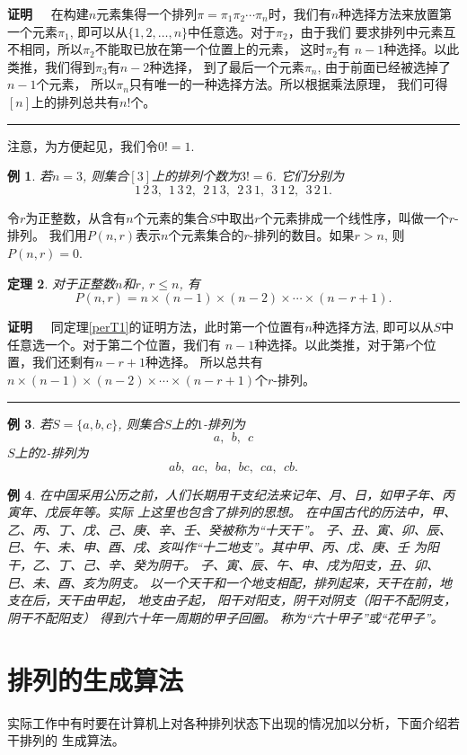 \documentclass[a4paper,11pt,twoside]{book}
\newtheorem{thm}{定理}[section]
\newtheorem{exa}[thm]{例}
\def\qed{\nopagebreak\hfill{\rule{4pt}{7pt}}\medbreak}
\def\pf{{\bf 证明~~ }}
\begin{document}
\pf 在构建$n$元素集得一个排列$\pi=\pi_1\pi_2 \cdots
\pi_n$时，我们有$n$种选择方法来放置第一个元素$\pi_1$,
即可以从$\{1,2,\ldots,n\}$中任意选。对于$\pi_2$，由于我们
要求排列中元素互不相同，所以$\pi_2$不能取已放在第一个位置上的元素，
这时$\pi_2$有 $n-1$种选择。以此类推，我们得到$\pi_3$有$n-2$种选择，
到了最后一个元素$\pi_n$, 由于前面已经被选掉了$n-1$个元素，
所以$\pi_n$只有唯一的一种选择方法。所以根据乘法原理，
我们可得$[n]$上的排列总共有$n!$个。 \qed


注意，为方便起见，我们令$0!=1$.

\begin{exa}
若$n=3$, 则集合$[3]$上的排列个数为$3!=6$. 它们分别为
\[ 1\,2\,3,~~ 1\,3\,2,~~2\,1\,3,~~2\,3\,1,~~ 3\,1\,2,~~ 3\,2\,1.\]
\end{exa}

令$r$为正整数，从含有$n$个元素的集合$S$中取出$r$个元素排成一个线性序，叫做一个$r$-排列。
我们用$P(n,r)$表示$n$个元素集合的$r$-排列的数目。如果$r>n$, 则$P(n,r)=0$.

\begin{thm}
对于正整数$n$和$r$, $r\leq n$, 有
\[ P(n,r)=n\times (n-1) \times (n-2)\times \cdots \times (n-r+1).\]
\end{thm}

\pf 同定理\ref{perT1}的证明方法，此时第一个位置有$n$种选择方法, 即可以从$S$中任意选一个。对于第二个位置，我们有
$n-1$种选择。以此类推，对于第$r$个位置，我们还剩有$n-r+1$种选择。
所以总共有$n\times (n-1) \times (n-2)\times \cdots \times (n-r+1)$个$r$-排列。 \qed

\begin{exa}
若$S=\{a,b,c\}$, 则集合$S$上的$1$-排列为
\[ a,~~b,~~c\]
$S$上的$2$-排列为
\[ ab,~~ac,~~ba,~~bc,~~ca,~~cb.\]
\end{exa}


\begin{exa}
在中国采用公历之前，人们长期用干支纪法来记年、月、日，如甲子年、丙寅年、戊辰年等。实际
上这里也包含了排列的思想。
在中国古代的历法中，甲、乙、丙、丁、戊、己、庚、辛、壬、癸被称为“十天干”。
子、丑、寅、卯、辰、巳、午、未、申、酉、戌、亥叫作“十二地支”。其中甲、丙、戊、庚、壬
为阳干，乙、丁、己、辛、癸为阴干。
子、寅、辰、午、申、戌为阳支，丑、卯、巳、未、酉、亥为阴支。
以一个天干和一个地支相配，排列起来，天干在前，地支在后，天干由甲起，
地支由子起，
阳干对阳支，阴干对阴支（阳干不配阴支，阴干不配阳支）
得到六十年一周期的甲子回圈。
称为“六十甲子”或“花甲子”。
\end{exa}

\section{排列的生成算法}
实际工作中有时要在计算机上对各种排列状态下出现的情况加以分析，下面介绍若干排列的
生成算法。
\end{document}
